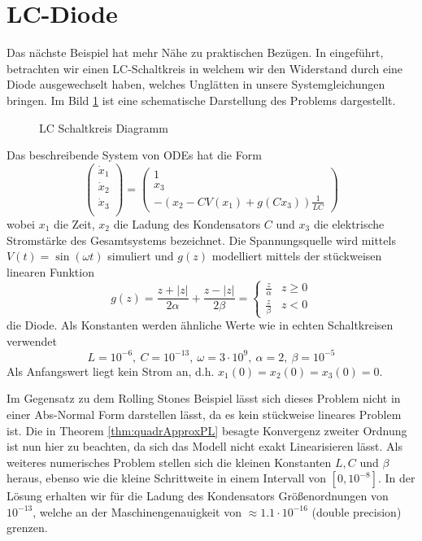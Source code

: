 \section{LC-Diode}
Das nächste Beispiel hat mehr Nähe zu praktischen Bezügen. In \cite{boeck2014experiments} eingeführt, betrachten wir einen LC-Schaltkreis in welchem wir den Widerstand durch eine Diode ausgewechselt haben, welches Unglätten in unsere Systemgleichungen bringen. Im Bild \ref{fig:lcDiode} ist eine schematische Darstellung des Problems dargestellt. 
\begin{figure}[H]
\centering

\caption{LC Schaltkreis Diagramm}
\label{fig:lcDiode}
\end{figure}
Das beschreibende System von ODEs hat die Form
\[
 \begin{pmatrix}
  \dot x_1\\
  \dot x_2\\
  \dot x_3\\
 \end{pmatrix}
 = 
 \begin{pmatrix}
  1\\
  x_3\\
  -\left(x_2-CV(x_1) + g(Cx_3)\right)\frac{1}{LC}
 \end{pmatrix}
\]
wobei $x_1$ die Zeit, $x_2$ die Ladung des Kondensators $C$ und $x_3$ die elektrische Stromstärke des Gesamtsystems bezeichnet. Die Spannungsquelle wird mittels $V(t)=\sin(\omega t)$ simuliert und $g(z)$ modelliert mittels der stückweisen linearen Funktion 
\begin{equation}
 g(z) = \frac{z+|z|}{2\alpha} + \frac{z-|z|}{2\beta}  = \begin{cases}
                                                         \frac{z}{\alpha} & z\geq 0\\
                                                         \frac{z}{\beta}  & z<0
                                                        \end{cases}
\label{eq:lcOde}                                                       
\end{equation}
die Diode. Als Konstanten werden ähnliche Werte wie in echten Schaltkreisen verwendet
\[
 L= 10^{-6},~ C=10^{-13},~ \omega = 3\cdot 10^{9},~\alpha = 2,~\beta = 10^{-5}
\]
Als Anfangswert liegt kein Strom an, d.h. $x_1(0)  = x_2(0) = x_3(0) = 0$.

Im Gegensatz zu dem Rolling Stones Beispiel lässt sich dieses Problem nicht in einer Abs-Normal Form darstellen lässt, da es kein stückweise lineares Problem ist. Die in Theorem \ref{thm:quadrApproxPL} besagte Konvergenz zweiter Ordnung ist nun hier zu beachten, da sich das Modell nicht exakt Linearisieren lässt. Als weiteres numerisches Problem stellen sich die kleinen Konstanten $L,C$ und $\beta$ heraus, ebenso wie die kleine Schrittweite in einem Intervall von $[0, 10^{-8}]$. In der Lösung erhalten wir für die Ladung des Kondensators Größenordnungen von $10^{-13}$, welche an der Maschinengenauigkeit von $\approx 1.1\cdot 10^{-16}$ (double precision) grenzen.

